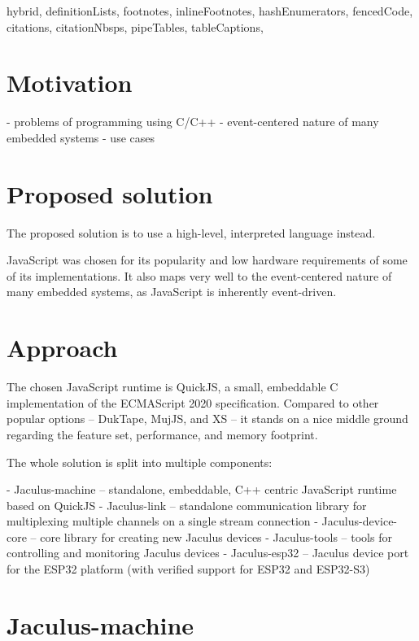 \documentclass[
  digital,
  oneside,
  nosansbold,
  nocolorbold,
  lof,
  lot
]{fithesis4}
\begin{document}
\begin{markdown*}{%
  hybrid,
  definitionLists,
  footnotes,
  inlineFootnotes,
  hashEnumerators,
  fencedCode,
  citations,
  citationNbsps,
  pipeTables,
  tableCaptions,
}

\chapter{Motivation}

  - problems of programming using C/C++
  - event-centered nature of many embedded systems
  - use cases


\chapter{Proposed solution}

The proposed solution is to use a high-level, interpreted language instead.

JavaScript was chosen for its popularity and low hardware requirements of some of its implementations. It also maps very well to the event-centered nature of many embedded systems, as JavaScript is inherently event-driven.


\chapter{Approach}

The chosen JavaScript runtime is QuickJS, a small, embeddable C implementation of the ECMAScript 2020 specification. Compared to other popular options -- DukTape, MujJS, and XS -- it stands on a nice middle ground regarding the feature set, performance, and memory footprint.


The whole solution is split into multiple components:

  - Jaculus-machine -- standalone, embeddable, C++ centric JavaScript runtime based on QuickJS
  - Jaculus-link -- standalone communication library for multiplexing multiple channels on a single stream connection
  - Jaculus-device-core -- core library for creating new Jaculus devices
  - Jaculus-tools -- tools for controlling and monitoring Jaculus devices
  - Jaculus-esp32 -- Jaculus device port for the ESP32 platform (with verified support for  ESP32 and ESP32-S3)


\chapter{Jaculus-machine}


\end{markdown*}
\end{document}
